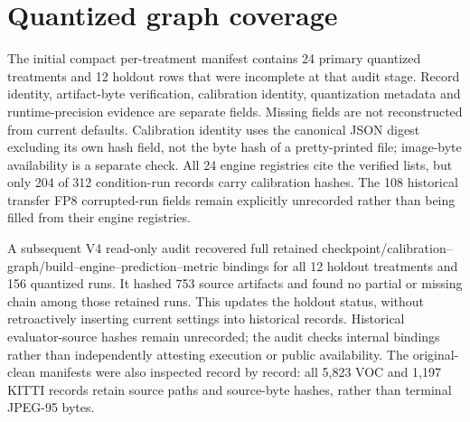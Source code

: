 \documentclass[10pt]{article}
\newcommand{\DeltaE}{\Delta E}
\begin{document}
\begin{table}[htbp]
\centering
\caption{Sensitivity of the 56 positive-raw-gap to negative-$\DeltaE$
point-sign disagreements to minimum interaction magnitude. Intervals are paired
image-bootstrap percentile intervals and are not multiplicity-adjusted.}
\label{tab:decision-reversal-sensitivity}
\small
\resizebox{0.86\textwidth}{!}{}
\end{table}

\FloatBarrier

\section{Quantized graph coverage}

The initial compact per-treatment manifest contains 24 primary quantized treatments and 12 holdout rows that were incomplete at that audit stage. Record identity, artifact-byte verification, calibration identity, quantization metadata and runtime-precision evidence are separate fields. Missing fields are not reconstructed from current defaults. Calibration identity uses the canonical JSON digest excluding its own hash field, not the byte hash of a pretty-printed file; image-byte availability is a separate check. All 24 engine registries cite the verified lists, but only 204 of 312 condition-run records carry calibration hashes. The 108 historical transfer FP8 corrupted-run fields remain explicitly unrecorded rather than being filled from their engine registries.

A subsequent V4 read-only audit recovered full retained checkpoint/calibration--graph/build--engine--prediction--metric bindings for all 12 holdout treatments and 156 quantized runs. It hashed 753 source artifacts and found no partial or missing chain among those retained runs. This updates the holdout status, without retroactively inserting current settings into historical records. Historical evaluator-source hashes remain unrecorded; the audit checks internal bindings rather than independently attesting execution or public availability. The original-clean manifests were also inspected record by record: all 5,823 VOC and 1,197 KITTI records retain source paths and source-byte hashes, rather than terminal JPEG-95 bytes.

\begin{table}[htbp]
\centering\small
\caption{Initial compact-inventory verification scope, superseded for holdout bindings by the subsequent full recovery described above. Local byte checks do not imply public engine availability or runtime-kernel precision verification.}
\label{tab:treatment-verification}

\end{table}
\end{document}
